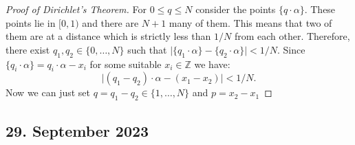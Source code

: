 \documentclass[a4paper,11pt,american]{article}
\newcommand{\Z}{\mathbb{Z}}
\theoremstyle{plain}
\theoremstyle{definition}
\begin{document}
  \begin{proof}[Proof of Dirichlet's Theorem] 
    For $0 \leq q \leq N$ consider the points $\{q \cdot\alpha\}$. These points lie in $[0,1)$ and there are $N+1$ many of them. This means that two of them are at a distance which is strictly less than $1/N$ from each other. Therefore, there exist $q_1,q_2 \in \{0,\dots,N\}$ such that $\vert\{q_1 \cdot\alpha\} -\{q_2 \cdot \alpha\} \vert < 1/N$. Since $\{q_i \cdot\alpha\} = q_i \cdot\alpha - x_i$  for some suitable $x_i \in\Z$ we have:
    \begin{displaymath}
          \vert (q_1 -q_2)\cdot\alpha - (x_1-x_2) \vert < 1/N.
    \end{displaymath}
    Now we can just set $q= q_1-q_2 \in \{1,\dots,N\}$ and $p=x_2-x_1$
  \end{proof}
  


\subsection*{29. September 2023}
\end{document}

